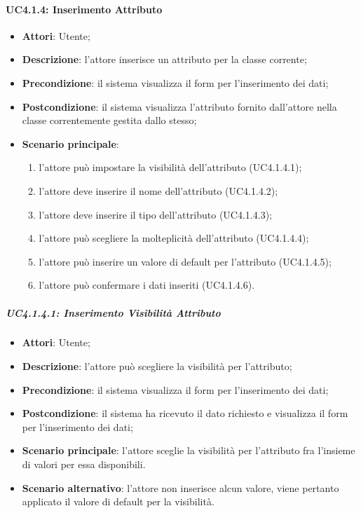 \begin{itemize}
\begin{itemize}
\begin{itemize}
\begin{itemize}
\paragraph{UC4.1.4: Inserimento Attributo}
\label{UC4.1.4}
\begin{itemize}
	\item \textbf{Attori}: Utente;
	\item \textbf{Descrizione}: l'attore inserisce un attributo per la classe corrente;
	\item \textbf{Precondizione}: il sistema visualizza il form per l'inserimento dei dati;
	\item \textbf{Postcondizione}: il sistema visualizza l'attributo fornito dall'attore nella classe correntemente gestita dallo stesso;
	\item \textbf{Scenario principale}:
	\begin{enumerate}
		\item l'attore può impostare la visibilità dell'attributo (UC4.1.4.1);
		\item l'attore deve inserire il nome dell'attributo (UC4.1.4.2);
		\item l'attore deve inserire il tipo dell'attributo (UC4.1.4.3);
		\item l'attore può scegliere la molteplicità dell'attributo (UC4.1.4.4);
		\item l'attore può inserire un valore di default per l'attributo (UC4.1.4.5);
		\item l'attore può confermare i dati inseriti (UC4.1.4.6).
	\end{enumerate}
\end{itemize}

\subparagraph{UC4.1.4.1: Inserimento Visibilità Attributo}
\label{UC4.1.4.1}
\begin{itemize}
	\item \textbf{Attori}: Utente;
	\item \textbf{Descrizione}: l'attore può scegliere la visibilità per l'attributo;
	\item \textbf{Precondizione}: il sistema visualizza il form per l'inserimento dei dati;
	\item \textbf{Postcondizione}: il sistema ha ricevuto il dato richiesto e visualizza il form per l'inserimento dei dati;
	\item \textbf{Scenario principale}: l'attore sceglie la visibilità per l'attributo fra l'insieme di valori per essa disponibili.
	\item \textbf{Scenario alternativo}: l'attore non inserisce alcun valore, viene pertanto applicato il valore di default per la visibilità.
\end{itemize}


\end{itemize}
\end{itemize}
\end{itemize}
\end{itemize}
